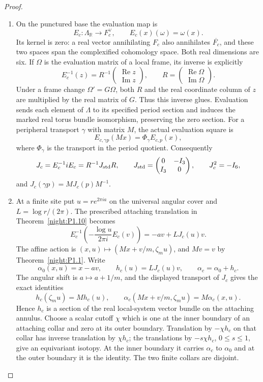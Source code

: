 \documentclass[11pt,a4paper]{article}
\theoremstyle{definition}
\begin{document}
\begin{proof}
\begin{enumerate}[label=\arabic*.]
\item On the punctured base the evaluation map is
\[
 E_c:\Lambda_{\mathbb R}\longrightarrow F_c^\vee,
 \qquad E_c(x)(\omega)=\omega(x).
\]
Its kernel is zero: a real vector annihilating $F_c$ also annihilates
$\overline{F_c}$, and these two spaces span the complexified cohomology
space. Both real dimensions are six. If $\Omega$ is the evaluation
matrix of a local frame, its inverse is explicitly
\[
 E_c^{-1}(z)=R^{-1}
       \begin{pmatrix}\operatorname{Re}z\\\operatorname{Im}z\end{pmatrix},
 \qquad
 R=\begin{pmatrix}\operatorname{Re}\Omega\\\operatorname{Im}\Omega\end{pmatrix}.
\]
Under a frame change $\Omega'=G\Omega$, both $R$ and the real coordinate
column of $z$ are multiplied by the real matrix of $G$. Thus this
inverse glues. Evaluation sends each element of $\Lambda$ to its
specified period section and induces the marked real torus bundle
isomorphism, preserving the zero section. For a peripheral transport
$\gamma$ with matrix $M$, the actual evaluation square is
\[
 E_{c,\gamma p}(Mx)=\Phi_\gamma E_{c,p}(x),
\]
where $\Phi_\gamma$ is the transport in the period quotient. Consequently
\[
 J_c=E_c^{-1}iE_c=R^{-1}J_{\rm std}R,
 \qquad
 J_{\rm std}=\begin{pmatrix}0&-I_3\\I_3&0\end{pmatrix},
 \qquad J_c^2=-I_6,
\]
and $J_c(\gamma p)=M J_c(p)M^{-1}$.

\item At a finite site put $u=r e^{2\pi ia}$ on the universal angular
cover and $L=\log r/(2\pi)$. The prescribed attaching translation in
Theorem~\ref{night:P1.10} becomes
\[
 E_c^{-1}\!\left(-\frac{\log u}{2\pi i}E_c(v)\right)
       =-av+LJ_c(u)v.
\]
The affine action is $(x,u)\mapsto(Mx+v/m,\zeta_m u)$, and $Mv=v$ by
Theorem~\ref{night:P1.1}. Write
\[
 \alpha_0(x,u)=x-av,
 \qquad h_c(u)=LJ_c(u)v,
 \qquad \alpha_c=\alpha_0+h_c.
\]
The angular shift is $a\mapsto a+1/m$, and the displayed transport of
$J_c$ gives the exact identities
\[
 h_c(\zeta_m u)=M h_c(u),\qquad
 \alpha_c(Mx+v/m,\zeta_m u)=M\alpha_c(x,u).
\]
Hence $h_c$ is a section of the real local-system vector bundle on
the attaching annulus. Choose a scalar cutoff $\chi$ which is one at
the inner boundary of an attaching collar and zero at its outer
boundary. Translation by $-\chi h_c$ on that collar has inverse
translation by $\chi h_c$; the translations by $-s\chi h_c$,
$0\leq s\leq1$, give an equivariant isotopy. At the inner boundary
it carries $\alpha_c$ to $\alpha_0$ and at the outer boundary it is
the identity. The two finite collars are disjoint.


\end{enumerate}
\end{proof}
\end{document}
